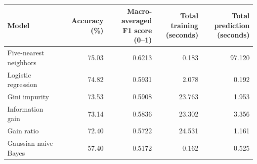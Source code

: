 \begin{tabular}{@{}lrrrr@{}}
\toprule
Model & Accuracy (\%) & \shortstack{Macro-averaged\\F1 score (0--1)} & \shortstack{Total training\\(seconds)} & \shortstack{Total prediction\\(seconds)} \\
\midrule
Five-nearest neighbors & 75.03 & 0.6213 & 0.183 & 97.120 \\
Logistic regression & 74.82 & 0.5931 & 2.078 & 0.192 \\
Gini impurity & 73.53 & 0.5908 & 23.763 & 1.953 \\
Information gain & 73.14 & 0.5836 & 23.302 & 3.356 \\
Gain ratio & 72.40 & 0.5722 & 24.531 & 1.161 \\
Gaussian naive Bayes & 57.40 & 0.5172 & 0.162 & 0.525 \\
\bottomrule
\end{tabular}

